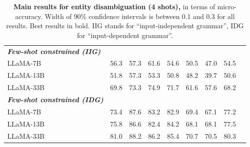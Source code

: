 \begin{table}[h!]
{\begin{tabular}{@{}lcccccccc@{}}
\midrule
\emph{\textbf{Few-shot constrained (IIG)}}\\
\hspace{4mm} LLaMA-7B                        &     56.3    &    57.3     &    61.6     &     54.6    &   50.5     &   47.0    &   54.5      \\
\hspace{4mm} LLaMA-13B                        &     51.8    &     57.3    &    53.3     &     50.8    &   48.2     &   39.7    &   50.6      \\
\hspace{4mm} LLaMA-33B                        &     69.8    &    73.3     &    74.9     &     71.7    &   61.6     &   57.6    &   68.2      \\
\midrule
\emph{\textbf{Few-shot constrained (IDG)}}\\
\hspace{4mm} LLaMA-7B                                 & 73.4  & 87.6  & 83.2  & 82.9  & 69.4  & 67.1 & 77.2 \\
\hspace{4mm} LLaMA-13B                                 & 75.8  & 86.6  & 82.4  & 84.2  & 68.1  & 68.1  & 77.5 \\
\hspace{4mm} LLaMA-33B                                 & 81.0  & 88.2  & 86.2  & 85.4  & 70.7  & 70.5  & 80.3 \\
\bottomrule
\end{tabular}
}
\caption{\textbf{Main results for entity disambiguation (4 shots),} in terms of micro-accuracy.
Width of 90\% confidence intervals is between 0.1 and 0.3 for all results. Best results in bold.
IIG stands for ``input-independent grammar'', IDG for ``input-dependent grammar''.
}
\label{tab:EntityDisambiguationResults}
\end{table}